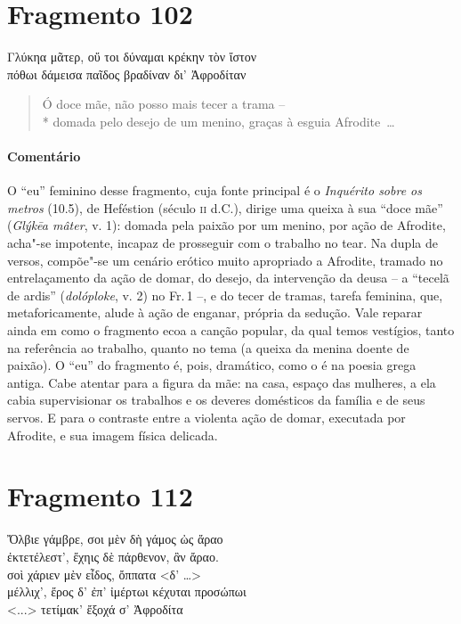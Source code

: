 \pagebreak

\section{Fragmento 102}

\begin{gkverse}
Γλύκηα μᾶτερ, οὔ τοι δύναμαι κρέκην τὸν ἴστον\\
πόθωι δάμεισα παῖδος βραδίναν δι’ Ἀφροδίταν
\end{gkverse}

\begin{verse}
Ó doce mãe, não posso mais tecer a trama -- \\*
domada pelo desejo de um menino, graças à esguia \mbox{Afrodite \ldots{}}
\end{verse}

{\paragraph{Comentário} O “eu” feminino desse fragmento, cuja fonte principal é o \textit{Inquérito
sobre os metros} (10.5), de Heféstion (século \textsc{ii} d.C.), dirige uma queixa à sua
“doce mãe” (\textit{Glýkēa mâter}, v. 1): domada pela paixão por um menino, por ação de Afrodite, acha"-se impotente, incapaz de prosseguir com o trabalho no tear. Na dupla de
versos, compõe"-se um cenário erótico muito apropriado a Afrodite, tramado no
entrelaçamento da ação de domar, do desejo, da intervenção da deusa
-- a ``tecelã de ardis” (\textit{dolóploke}, v. 2) no Fr.\,1 --, e do tecer de tramas, tarefa feminina, que, metaforicamente, alude à ação de enganar, própria da sedução.
Vale reparar ainda em como o fragmento ecoa a canção popular, da qual
temos vestígios, tanto na referência ao trabalho, quanto no tema (a queixa da
menina doente de paixão). O “eu” do fragmento é, pois, dramático, como o é
na poesia grega antiga. Cabe atentar para a figura da mãe: na
casa, espaço das mulheres, a ela cabia supervisionar os trabalhos e os deveres
domésticos da família e de seus servos. E para o contraste entre a violenta
ação de domar, executada por Afrodite, e sua imagem física delicada.}

\pagebreak

\section{Fragmento 112}

\begin{gkverse}
Ὄλβιε γάμβρε, σοι μὲν δὴ γάμος ὠς ἄραο\\
ἐκτετέλεστ’, ἔχηις δὲ πάρθενον, ἂν ἄραο.\\
σοὶ χάριεν μὲν εἶδος, ὄππατα <δ’ \ldots{}>\\
μέλλιχ’, ἔρος δ’ ἐπ’ ἰμέρτωι κέχυται προσώπωι\\
<...> τετίμακ’ ἔξοχά σ’ Ἀφροδίτα
\end{gkverse}

